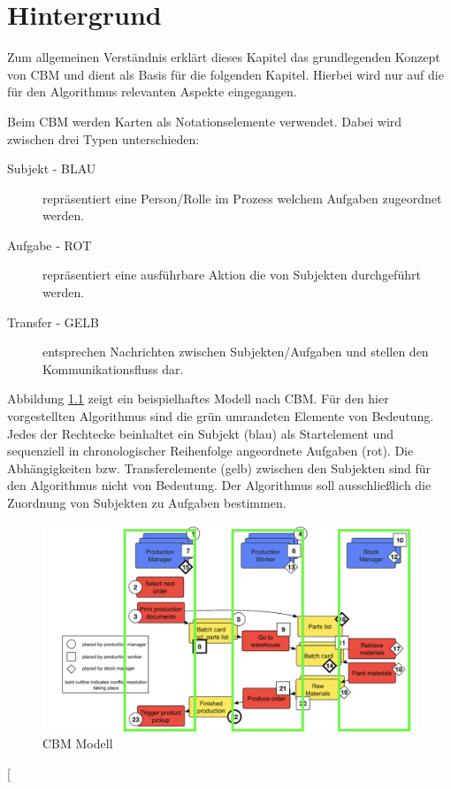 \chapter{Hintergrund} %
\label{cha:hintergrund}
Zum allgemeinen Verständnis erklärt dieses Kapitel das grundlegenden Konzept von CBM und dient als Basis für die folgenden Kapitel. Hierbei wird nur auf die für den Algorithmus relevanten Aspekte eingegangen. 

Beim CBM werden Karten als Notationselemente verwendet. Dabei wird zwischen drei Typen unterschieden:
\begin{description}
	\item[Subjekt - BLAU] repräsentiert eine Person/Rolle im Prozess welchem Aufgaben zugeordnet werden.
	\item[Aufgabe - ROT] repräsentiert eine ausführbare Aktion die von Subjekten durchgeführt werden.
	\item[Transfer - GELB] entsprechen Nachrichten zwischen Subjekten/Aufgaben und stellen den Kommunikationsfluss dar.
\end{description}

Abbildung \ref{fig:cbm-grundstruktur} zeigt ein beispielhaftes Modell nach CBM. Für den hier vorgestellten Algorithmus sind die grün umrandeten Elemente von Bedeutung. Jedes der Rechtecke beinhaltet ein Subjekt (blau) als Startelement und sequenziell in chronologischer Reihenfolge angeordnete Aufgaben (rot). Die Abhängigkeiten bzw. Transferelemente (gelb) zwischen den Subjekten sind für den Algorithmus nicht von Bedeutung. Der Algorithmus soll ausschließlich die Zuordnung von Subjekten zu Aufgaben bestimmen.
\begin{figure}[H]
	\centering 
	\begin{minipage}[b]{0.9\textwidth} 
		\includegraphics[width=\textwidth]{figures/cbm-grundstruktur.png} 		\caption{CBM Modell 
		\protect~\cite{oppl2016linking}} 
		\label{fig:cbm-grundstruktur} 
	\end{minipage}
\end{figure}[
